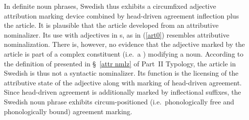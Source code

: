 In definite noun phrases, Swedish thus exhibits a circumfixed adjective attribution marking device combined by head\hyp{}driven agreement inflection plus the article. It is plausible that the article developed from an attributive nominalizer. Its use with adjectives in s, as in (\ref{art0}) resembles attributive nominalization. There is, however, no evidence that the adjective marked by the article is part of a complex constituent (i.e.~a ) modifying a noun. According to the definition of  presented in \S~\ref{attr nmlz} of Part~II Typology, the article in Swedish is thus not a syntactic nominalizer. Its function is the licensing of the attributive state of the adjective along with marking of head\hyp{}driven agreement. Since head\hyp{}driven agreement is additionally marked by inflectional suffixes, the Swedish noun phrase exhibits circum-positioned (i.e.~phonologically free and phonologically bound) agreement marking.

